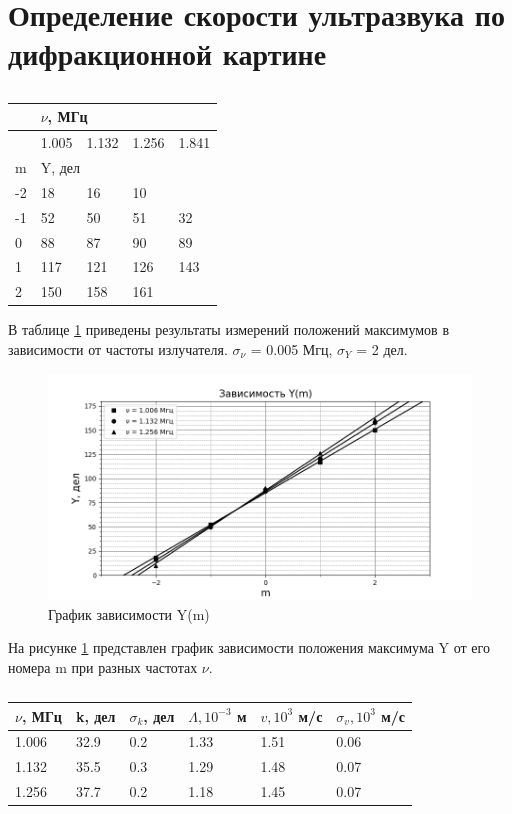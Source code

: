 \documentclass{article}
\begin{document}
\section{Определение скорости ультразвука по дифракционной картине}
\begin{table}[h!]
\centering
\caption{}
\label{table1}
\begin{tabular}{|l|l|l|l|l|}
\hline
   & \multicolumn{4}{l|}{$\nu$, МГц} \\ \hline
   & 1.005  & 1.132  & 1.256 & 1.841 \\ \hline
m  & \multicolumn{4}{l|}{Y, дел}     \\ \hline
-2 & 18     & 16     & 10    &       \\ \hline
-1 & 52     & 50     & 51    & 32    \\ \hline
0  & 88     & 87     & 90    & 89    \\ \hline
1  & 117     & 121     & 126    & 143    \\ \hline
2  & 150     & 158     & 161    &       \\ \hline
\end{tabular}
\end{table}
В таблице \ref{table1} приведены результаты измерений положений максимумов в зависимости от частоты излучателя. $\sigma_{\nu}$ = 0.005 Мгц, $\sigma_Y$ = 2 дел.
\begin{figure}[h!]
  \includegraphics[width=\linewidth]{Figure_1.png}
  \caption{График зависимости Y(m)}
  \label{fig:graph1}
\end{figure}
На рисунке \ref{fig:graph1} представлен график зависимости положения максимума Y от его номера m при разных частотах $\nu$.
\begin{table}[]
\centering
\caption{}
\label{table2}
\begin{tabular}{|l|l|l|l|l|l|}
\hline
$\nu$, МГц & k, дел & $\sigma_k$, дел & $\Lambda,10^{-3}$ м & $v, 10^3$ м/с & $\sigma_v, 10^3$ м/с \\ \hline
1.006      & 32.9   & 0.2             & 1.33               & 1.51                 & 0.06                        \\ \hline
1.132      & 35.5   & 0.3             & 1.29               & 1.48                 & 0.07                        \\ \hline
1.256      & 37.7   & 0.2             & 1.18               & 1.45                 & 0.07                        \\ \hline
\end{tabular}
\end{table}
\end{document}
